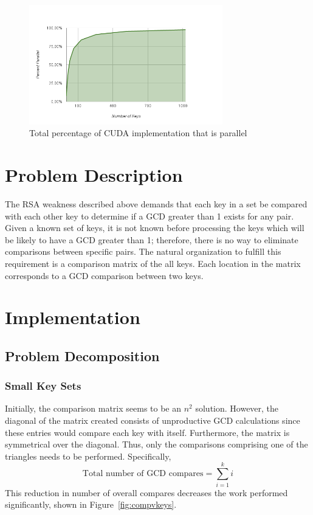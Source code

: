 \documentclass[smallextended]{svjour3}       %
\begin{document}
\begin{figure}
   \centering
   \includegraphics[width=0.75\textwidth]{chart_7}
   \caption{Total percentage of CUDA implementation that is parallel}
   \label{fig:parPercent}
\end{figure}


\section{Problem Description}
\label{sec:probdesc}
The RSA weakness described above demands that each key in a set be 
compared with each other key to determine if a GCD greater than 1 exists for 
any pair. Given a known set of keys, it is not known before processing 
the keys which will be likely to have a GCD greater than 1; therefore, there 
is no way to eliminate comparisons between specific pairs. The natural 
organization to fulfill this requirement is a comparison matrix of the all 
keys. Each location in the matrix corresponds to a GCD comparison between two 
keys.


\section{Implementation}
\label{sec:impl}

\subsection{Problem Decomposition}
\label{subsec:probdecomp}

\subsubsection{Small Key Sets}
\label{subsubsec:smallsets}
Initially, the comparison matrix seems to be an $n^2$ solution. However, the 
diagonal of the matrix created consists of unproductive GCD calculations since 
these entries would compare each key with itself. Furthermore, the matrix is 
symmetrical over the diagonal. Thus, only the comparisons comprising one of 
the triangles needs to be performed. Specifically, 
\begin{equation}
   \mbox{Total number of GCD compares} = \sum_{i=1}^k i
   \label{eq:gcd}
\end{equation}
This reduction in number of overall compares decreases the work 
performed significantly, shown in Figure~\ref{fig:compvkeys}. 
\end{document}
